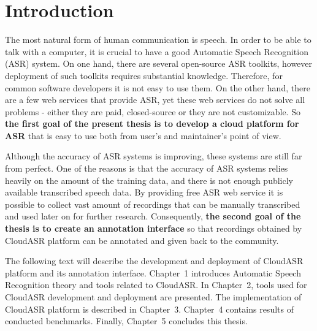 \chapter*{Introduction}

The most natural form of human communication is speech.
In order to be able to talk with a computer,
  it is crucial to have a good Automatic Speech Recognition (ASR) system.
On one hand, there are several open-source ASR toolkits,
  however deployment of such toolkits requires substantial knowledge.
Therefore, for common software developers it is not easy to use them.
On the other hand, there are a few web services that provide ASR,
  yet these web services do not solve all problems -
  either they are paid, closed-source or they are not customizable.
So \textbf{the first goal of the present thesis is to develop a cloud platform for ASR}
  that is easy to use both from user's and maintainer's point of view.

Although the accuracy of ASR systems is improving,
  these systems are still far from perfect.
One of the reasons is that the accuracy of ASR systems relies heavily on the amount of the training data,
  and there is not enough publicly available transcribed speech data.
By providing free ASR web service it is possible to collect vast amount of recordings
  that can be manually transcribed and used later on for further research.
Consequently, \textbf{the second goal of the thesis is to create an annotation interface}
  so that recordings obtained by CloudASR platform can be annotated and given back to the community.

The following text will describe the development and deployment of CloudASR platform and its annotation interface.
Chapter~1 introduces Automatic Speech Recognition theory and tools related to CloudASR.
In Chapter~2, tools used for CloudASR development and deployment are presented.
The implementation of CloudASR platform is described in Chapter~3.
Chapter~4 contains results of conducted benchmarks.
Finally, Chapter~5 concludes this thesis.
